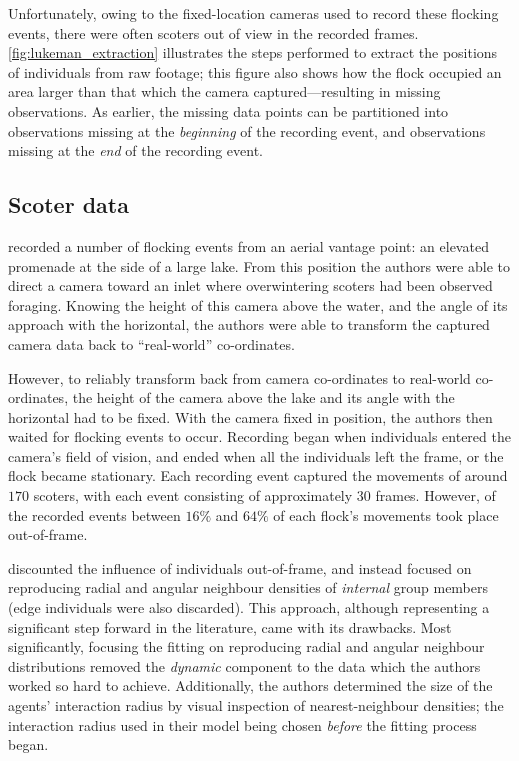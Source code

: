 Unfortunately, owing to the fixed-location cameras used to record these
flocking events, there were often scoters out of view in the recorded frames.
\cref{fig:lukeman_extraction} illustrates the steps performed to extract the
positions of individuals from raw footage; this figure also shows how the flock
occupied an area larger than that which the camera captured---resulting in
missing observations. As earlier, the missing data points can be partitioned
into observations missing at the \emph{beginning} of the recording event, and
observations missing at the \emph{end} of the recording event.

\subsection{Scoter data}

\textcite{lukeman10} recorded a number of flocking events from an aerial
vantage point: an elevated promenade at the side of a large lake. From this
position the authors were able to direct a camera toward an inlet where
overwintering scoters had been observed foraging. Knowing the height of this
camera above the water, and the angle of its approach with the horizontal, the
authors were able to transform the captured camera data back to ``real-world''
co-ordinates.

However, to reliably transform back from camera co-ordinates to real-world
co-ordinates, the height of the camera above the lake and its angle with the
horizontal had to be fixed. With the camera fixed in position, the authors then
waited for flocking events to occur. Recording began when individuals entered
the camera's field of vision, and ended when all the individuals left the
frame, or the flock became stationary. Each recording event captured the
movements of around $170$ scoters, with each event consisting of approximately
$30$ frames. However, of the recorded events between $16\%$ and $64\%$ of each
flock's movements took place out-of-frame.

\textcite{lukeman10} discounted the influence of individuals out-of-frame, and
instead focused on reproducing radial and angular neighbour densities of
\emph{internal} group members (edge individuals were also discarded). This
approach, although representing a significant step forward in the literature,
came with its drawbacks. Most significantly, focusing the fitting on
reproducing radial and angular neighbour distributions removed the
\emph{dynamic} component to the data which the authors worked so hard to
achieve. Additionally, the authors determined the size of the agents'
interaction radius by visual inspection of nearest-neighbour densities; the
interaction radius used in their model being chosen \emph{before} the fitting
process began.

